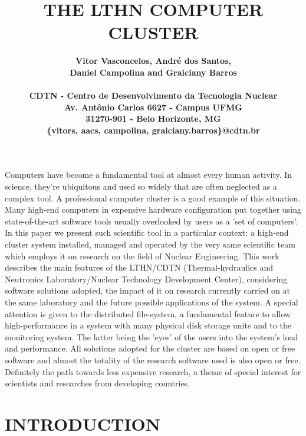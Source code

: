 \documentclass[twoside,a4paper,12pt,english]{inac19}
\title{THE LTHN COMPUTER CLUSTER}
\author{
  \bf{Vitor Vasconcelos, Andr\'e dos Santos,}\\
  \bf{Daniel Campolina and Graiciany Barros}\\ \\
  CDTN - Centro de Desenvolvimento da Tecnologia Nuclear\\
  Av. Ant\^onio Carlos 6627 - Campus UFMG\\
  31270-901 - Belo Horizonte, MG\\
  \{vitors, aacs, campolina, graiciany.barros\}@cdtn.br}
\begin{document}
\maketitle



\pagestyle{myheadings}
\thispagestyle{empty}
\markboth{}{}


\thispagestyle{empty}

\begin{abstract_full_paper}
Computers have become a fundamental tool at almost every human activity.
In science, they're ubiquitous and used so widely that are often neglected
as a complex tool. A professional computer cluster is a good example of
this situation. Many high-end computers in expensive hardware configuration
put together using state-of-the-art software tools usually overlooked by
users as a 'set of computers'. In this paper we present such scientific tool
in a particular context: a high-end cluster system installed, managed and operated
by the very same scientific team which employs it on research on the field of Nuclear Engineering.
This work describes the main features of the LTHN/CDTN (Thermal-hydraulics and Neutronics
Laboratory/Nuclear Technology Development Center), considering software solutions
adopted, the impact of it on research currently carried on at the same laboratory
and the future possible applications of the system. A special attention is given to
the distributed file-system, a fundamental feature to allow high-performance in a system
with many physical disk storage units and to the monitoring system. The latter being
the 'eyes' of the users into the system's load and performance. All solutions adopted for the
cluster are based on open or free software and almost the totality of the research
software used is also open or free. Definitely the path towards less expensive
research, a theme of special interest for scientists and researches from developing countries.
\end{abstract_full_paper}

\section{INTRODUCTION}\label{int}
\end{document}
